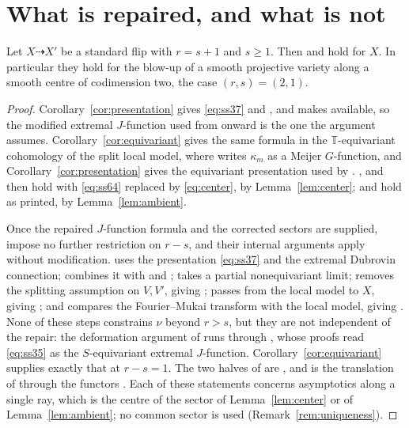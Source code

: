 \section{What is repaired, and what is not}
\label{sec:scope}

\begin{theorem}
  \label{thm:assembled}
  Let \(X\dashrightarrow X'\) be a standard flip with \(r=s+1\) and
  \(s\ge1\).  Then \cite[Theorems~1.2, 1.4, 9.9 and~9.14]{SS} and
  \cite[Corollary~1.5]{SS} hold for \(X\).  In particular they hold for the
  blow-up of a smooth projective variety along a smooth centre of
  codimension two, the case \((r,s)=(2,1)\).
\end{theorem}

\begin{proof}
  Corollary~\ref{cor:presentation} gives \eqref{eq:ss37} and
  \cite[Theorem~1.2]{SS}, and makes \cite[(39)--(40)]{SS} available, so the
  modified extremal \(J\)-function used from \cite[Section~7]{SS} onward is
  the one the argument assumes.  Corollary~\ref{cor:equivariant} gives the
  same formula in the \(\mathbb T\)-equivariant cohomology of the split
  local model, where \cite[Lemma~7.4]{SS} writes \(\kappa_{m}\) as a Meijer
  \(G\)-function, and Corollary~\ref{cor:presentation} gives the equivariant
  presentation used by \cite[Proposition~9.1]{SS}.  \cite[Proposition~7.5]{SS},
  \cite[Corollary~7.6]{SS} and \cite[Proposition~7.8]{SS} then hold with
  \eqref{eq:ss64} replaced by \eqref{eq:center}, by Lemma~\ref{lem:center};
  \cite[Propositions~8.2 and~8.3]{SS} and \cite[Corollary~8.4]{SS} hold as
  printed, by Lemma~\ref{lem:ambient}.

  Once the repaired \(J\)-function formula and the corrected sectors are
  supplied, \cite[Sections~9.1--9.4]{SS} impose no further restriction on
  \(r-s\), and their internal arguments apply without modification.
  \cite[Proposition~9.1]{SS} uses the presentation \eqref{eq:ss37} and the
  extremal Dubrovin connection; \cite[Proposition~9.2]{SS} combines it with
  \cite[Proposition~7.8]{SS} and \cite[Corollary~8.4]{SS};
  \cite[Corollary~9.3]{SS} takes a
  partial nonequivariant limit; \cite[Section~9.2]{SS} removes the splitting
  assumption on \(V,V'\), giving \cite[Corollary~9.7]{SS};
  \cite[Section~9.3]{SS} passes from the local model to \(X\), giving
  \cite[Theorem~9.9]{SS}; and \cite[Section~9.4]{SS} compares the
  Fourier--Mukai transform with the local model, giving
  \cite[Theorem~9.14]{SS}.  None of these steps constrains \(\nu\) beyond
  \(r>s\), but they are not independent of the repair: the deformation
  argument of \cite[Section~9.2]{SS} runs through \cite[Lemmas~9.4--9.6]{SS},
  whose proofs read \eqref{eq:ss35} as the \(S\)-equivariant extremal
  \(J\)-function.  Corollary~\ref{cor:equivariant} supplies exactly that at
  \(r-s=1\).
  The two halves of \cite[Theorem~1.4]{SS} are
  \cite[Theorems~9.9 and~9.14]{SS}, and \cite[Corollary~1.5]{SS} is the
  translation of \cite[Theorem~1.4]{SS} through the functors
  \cite[(3)]{SS}.  Each of these statements concerns asymptotics along a
  single ray, which is the centre of the sector of Lemma~\ref{lem:center} or
  of Lemma~\ref{lem:ambient}; no common sector is used
  (Remark~\ref{rem:uniqueness}).
\end{proof}

